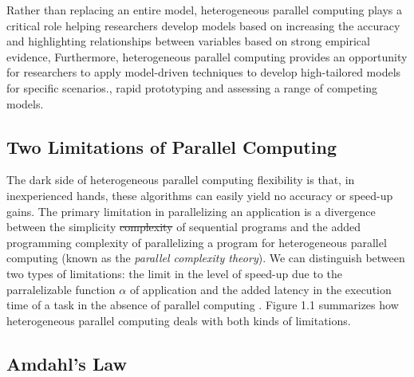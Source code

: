 \documentclass[10pt]{article}[draft]
\begin{document}
\begin{itemize}
	Rather than replacing an entire model, heterogeneous parallel computing plays a critical role helping researchers develop models based on increasing the accuracy and highlighting relationships between variables based on strong empirical evidence, Furthermore, heterogeneous parallel computing provides an opportunity for researchers to apply model-driven techniques to develop high-tailored models for specific scenarios., rapid prototyping and assessing a range of competing models. 
	
\newpage
\subsection*{Two Limitations of Parallel Computing}
		
		The dark side of heterogeneous parallel computing flexibility is that, in inexperienced hands, these algorithms can easily yield no accuracy or speed-up gains. The primary limitation in parallelizing an application is a divergence between the simplicity \st{complexity} of sequential programs and the added programming complexity of parallelizing a program for heterogeneous parallel computing  (known as the \emph{parallel complexity theory}). We can distinguish between two types of limitations: the limit in the level of speed-up due to the parralelizable function $\alpha$ of application and the added latency in the execution time of a task in the  absence of parallel computing . Figure 1.1 summarizes how heterogeneous parallel computing deals with both kinds of limitations.
		
	\newpage
	\subsection*{Amdahl's Law}
		

\end{itemize}
\end{document}
